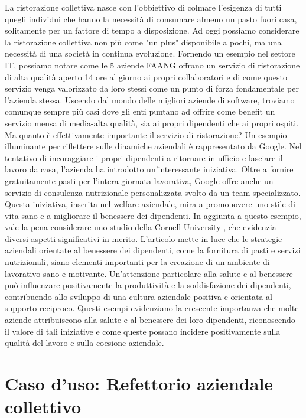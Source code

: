 \documentclass[a4paper, titlepage, 12pt, openright, twoside]{book}
\begin{document}
La ristorazione collettiva nasce con l'obbiettivo di colmare l'esigenza di tutti quegli individui
che hanno la necessità di consumare almeno un pasto fuori casa, solitamente per un fattore di tempo a disposizione.
Ad oggi possiamo considerare la ristorazione collettiva non più come "un plus" disponibile a pochi, ma una necessità di una società in continua evoluzione.
Fornendo un esempio nel settore IT, possiamo notare come le 5 aziende FAANG offrano un servizio di ristorazione di alta qualità aperto 14 ore al giorno ai propri collaboratori
e di come questo servizio venga valorizzato da loro stessi come un punto di forza fondamentale per l'azienda stessa.
\newline
Uscendo dal mondo delle migliori aziende di software, troviamo comunque sempre più casi dove gli enti puntano ad offrire come benefit un servizio mensa di media-alta qualità,
sia ai propri dipendenti che ai propri ospiti.
\newline
Ma quanto è effettivamente importante il servizio di ristorazione?
\newline
Un esempio illuminante per riflettere sulle dinamiche aziendali è rappresentato da Google. Nel tentativo di incoraggiare i propri dipendenti a ritornare in ufficio e lasciare il lavoro da casa, l'azienda ha introdotto un'interessante iniziativa. Oltre a fornire gratuitamente pasti per l'intera giornata lavorativa, Google offre anche un servizio di consulenza nutrizionale personalizzata svolto da un team specializzato. Questa iniziativa, inserita nel welfare aziendale, mira a promouovere uno stile di vita sano e a migliorare il benessere dei dipendenti.
In aggiunta a questo esempio, vale la pena considerare uno studio della Cornell University \cite{cornell}, che evidenzia diversi aspetti significativi in merito. L'articolo mette in luce che le strategie aziendali orientate al benessere dei dipendenti, come la fornitura di pasti e servizi nutrizionali, siano elementi importanti per la creazione di un ambiente di lavorativo sano e motivante. Un'attenzione particolare alla salute e al benessere può influenzare positivamente la produttività e la soddisfazione dei dipendenti, contribuendo allo sviluppo di una cultura aziendale positiva e orientata al supporto reciproco. Questi esempi evidenziano la crescente importanza che molte aziende attribuiscono alla salute e al benessere dei loro dipendenti, riconoscendo il valore di tali iniziative e come queste possano incidere positivamente sulla qualità del lavoro e sulla coesione aziendale.

\chapter{Caso d'uso: Refettorio aziendale collettivo}\label{chap:caso}
\end{document}
